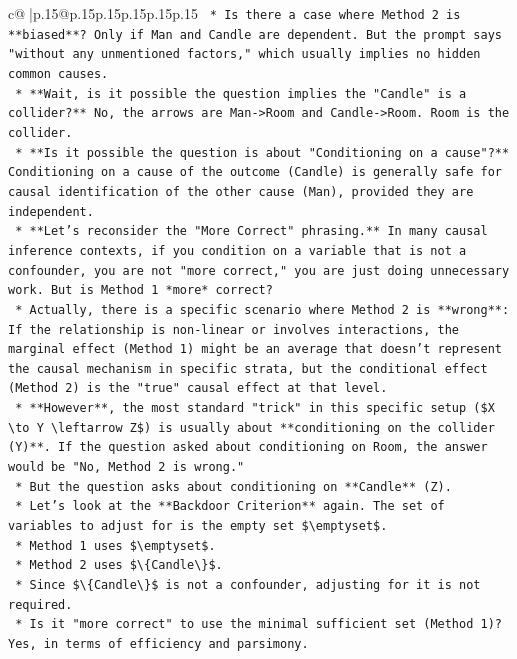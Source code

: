 \documentclass{article}
\begin{document}
{\begin{supertabular}{c@{$\;$}|p{.15\linewidth}@{}p{.15\linewidth}p{.15\linewidth}p{.15\linewidth}p{.15\linewidth}p{.15\linewidth}}
{{{\texttt{    *   Is there a case where Method 2 is **biased**? Only if Man and Candle are dependent. But the prompt says "without any unmentioned factors," which usually implies no hidden common causes.} \\
\texttt{    *   **Wait, is it possible the question implies the "Candle" is a collider?** No, the arrows are Man{-}>Room and Candle{-}>Room. Room is the collider.} \\
\texttt{    *   **Is it possible the question is about "Conditioning on a cause"?** Conditioning on a cause of the outcome (Candle) is generally safe for causal identification of the other cause (Man), provided they are independent.} \\
\texttt{    *   **Let's reconsider the "More Correct" phrasing.** In many causal inference contexts, if you condition on a variable that is not a confounder, you are not "more correct," you are just doing unnecessary work. But is Method 1 *more* correct?} \\
\texttt{    *   Actually, there is a specific scenario where Method 2 is **wrong**: If the relationship is non{-}linear or involves interactions, the marginal effect (Method 1) might be an average that doesn't represent the causal mechanism in specific strata, but the conditional effect (Method 2) is the "true" causal effect at that level.} \\
\texttt{    *   **However**, the most standard "trick" in this specific setup (\$X \textbackslash{}to Y \textbackslash{}leftarrow Z\$) is usually about **conditioning on the collider (Y)**. If the question asked about conditioning on Room, the answer would be "No, Method 2 is wrong."} \\
\texttt{    *   But the question asks about conditioning on **Candle** (Z).} \\
\texttt{    *   Let's look at the **Backdoor Criterion** again. The set of variables to adjust for is the empty set \$\textbackslash{}emptyset\$.} \\
\texttt{    *   Method 1 uses \$\textbackslash{}emptyset\$.} \\
\texttt{    *   Method 2 uses \$\textbackslash{}\{Candle\textbackslash{}\}\$.} \\
\texttt{    *   Since \$\textbackslash{}\{Candle\textbackslash{}\}\$ is not a confounder, adjusting for it is not required.} \\
\texttt{    *   Is it "more correct" to use the minimal sufficient set (Method 1)? Yes, in terms of efficiency and parsimony.} \\
}}}
\end{supertabular}}
\end{document}
